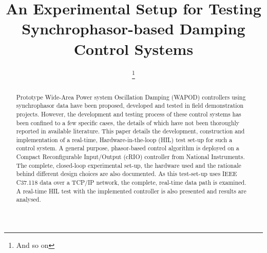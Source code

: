 \documentclass[conference]{IEEEtran}
\begin{document}
\title{An Experimental Setup for Testing Synchrophasor-based Damping Control Systems}


\author{
\thanks{And so on}
\and

\and
{}
}

\maketitle
\begin{abstract}
Prototype Wide-Area Power system Oscillation Damping (WAPOD) controllers using synchrophasor data have been proposed, developed and tested in field demonstration projects. However, the development and testing process of these control systems has been confined to a few specific cases, the details of which have not been thoroughly reported in available literature. This paper details the development, construction and implementation of a real-time, Hardware-in-the-loop (HIL) test set-up for such a control system. A general purpose, phasor-based control algorithm is deployed on a Compact Reconfigurable Input/Output (cRIO) controller from National Instruments. The complete, closed-loop experimental set-up, the hardware used and the rationale behind different design choices are also documented. As this test-set-up uses IEEE C37.118 data over a TCP/IP network, the complete, real-time data path is examined. A real-time HIL test with the implemented controller is also presented and results are analysed.

\end{abstract}


%
\IEEEpeerreviewmaketitle
\end{document}
